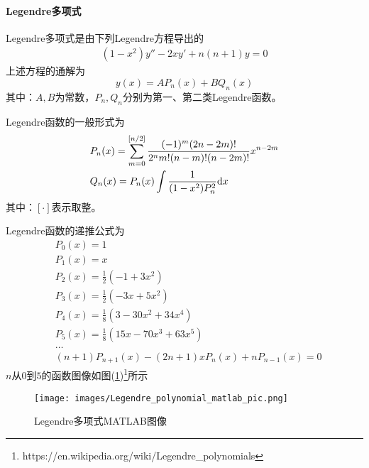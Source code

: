                 \paragraph{Legendre多项式}Legendre多项式是由下列Legendre方程导出的
                \begin{align*}
                    (1 - x^2) y'' -2xy' +n(n+1)y = 0
                \end{align*}
                上述方程的通解为
                \[
                    y(x) = AP_n(x) +BQ_n(x)
                \]
                其中：$A,B$为常数，$P_n,Q_n$分别为第一、第二类Legendre函数。
                \par
                Legendre函数的一般形式为
                \begin{align}
                    \label{eq:Legendre函数的一般形式}
                    &P_n(x) = \sum_{m=0}^{[n/2]} \frac{(-1)^m (2n-2m)!}
                    {2^n m! (n-m)!(n-2m)!} x^{n-2m}
                    \\
                    &Q_n(x) = P_n(x)\int\frac{1}{(1-x^2)P_n^2}\mathrm{d}x \notag
                \end{align}
                其中：$[\cdot]$表示取整。
                \par
                Legendre函数的递推公式为
                \begin{align*}
                &P_0(x) = 1 \\
                &P_1(x) = x \\
                &P_2(x) = \frac{1}{2}(-1+3x^2) \\
                &P_3(x) = \frac{1}{2}(-3x+5x^2) \\
                &P_4(x) = \frac{1}{8}(3-30x^2+34x^4) \\
                &P_5(x) = \frac{1}{8}(15x-70x^3+63x^5) \\
                &\dots \\
                &(n+1)P_{n+1}(x) - (2n+1)xP_n(x)+nP_{n-1}(x)= 0
                \end{align*}
                $n$从$0$到$5$的函数图像如图(\ref{fig:Legendre多项式MATLAB图像})\footnote{https://en.wikipedia.org/wiki/Legendre\_polynomials}所示
                \begin{figure}[H]
                \centering
                \texttt{[image: images/Legendre\_polynomial\_matlab\_pic.png]}
                \caption{Legendre多项式MATLAB图像}
                \label{fig:Legendre多项式MATLAB图像}
                \end{figure}
